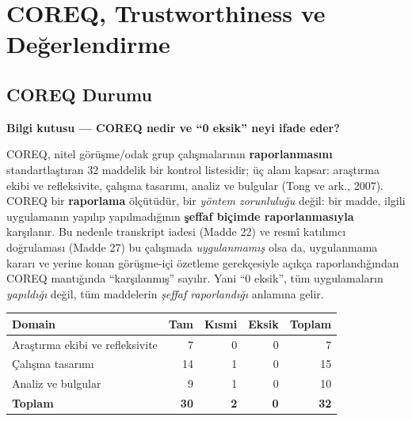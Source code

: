 \documentclass[
  turkish,
  a4paper,
  DIV=11,
  numbers=noendperiod]{scrreprt}
\newcounter{none} %
\begin{document}
\chapter{COREQ, Trustworthiness ve Değerlendirme}\label{sec-raporlama}

\section{COREQ Durumu}\label{coreq-durumu}

\begin{tcolorbox}[enhanced jigsaw, arc=.35mm, bottomrule=.15mm, bottomtitle=1mm, breakable, colback=white, colbacktitle=quarto-callout-note-color!10!white, colframe=quarto-callout-note-color-frame, coltitle=black, left=2mm, leftrule=.75mm, opacityback=0, opacitybacktitle=0.6, rightrule=.15mm, title=\textcolor{quarto-callout-note-color}{\faInfo}\hspace{0.5em}{Not}, titlerule=0mm, toprule=.15mm, toptitle=1mm]

\textbf{Bilgi kutusu --- COREQ nedir ve ``0 eksik'' neyi ifade eder?}

COREQ, nitel görüşme/odak grup çalışmalarının \textbf{raporlanmasını}
standartlaştıran 32 maddelik bir kontrol listesidir; üç alanı kapsar:
araştırma ekibi ve refleksivite, çalışma tasarımı, analiz ve bulgular
(Tong ve ark., 2007). COREQ bir \textbf{raporlama} ölçütüdür, bir
\emph{yöntem zorunluluğu} değil: bir madde, ilgili uygulamanın yapılıp
yapılmadığının \textbf{şeffaf biçimde raporlanmasıyla} karşılanır. Bu
nedenle transkript iadesi (Madde 22) ve resmî katılımcı doğrulaması
(Madde 27) bu çalışmada \emph{uygulanmamış} olsa da, uygulanmama kararı
ve yerine konan görüşme-içi özetleme gerekçesiyle açıkça
raporlandığından COREQ mantığında ``karşılanmış'' sayılır. Yani ``0
eksik'', tüm uygulamaların \emph{yapıldığı} değil, tüm maddelerin
\emph{şeffaf raporlandığı} anlamına gelir.

\end{tcolorbox}

{\def\LTcaptype{none} %
\begin{longtable}[]{@{}lrrrr@{}}
\toprule\noalign{}
Domain & Tam & Kısmi & Eksik & Toplam \\
\midrule\noalign{}
\endhead
\bottomrule\noalign{}
\endlastfoot
Araştırma ekibi ve refleksivite & 7 & 0 & 0 & 7 \\
Çalışma tasarımı & 14 & 1 & 0 & 15 \\
Analiz ve bulgular & 9 & 1 & 0 & 10 \\
\textbf{Toplam} & \textbf{30} & \textbf{2} & \textbf{0} & \textbf{32} \\
\end{longtable}
}
\end{document}
